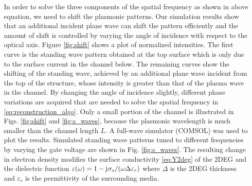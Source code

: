\documentclass[10pt]{article}
\renewcommand{\v}[1]{\mathbf{#1}} %
\renewcommand{\^}{\hat}  %
\renewcommand{\O}{\omega}  %
\newcommand{\E}{\varepsilon}  %
\newcommand{\p}{\rho}  %
\renewcommand{\^}{\hat}  %
\renewcommand{\j}{\mathrm{j}\mkern1mu} %
\begin{document}
%
In order to solve the three components of the spatial frequency as shown in above equation, we need to shift the plasmonic patterns. Our simulation results show that an additional incident plane wave can shift the pattern efficiently and the amount of shift is controlled by varying the angle of incidence with respect to the optical axis. Figure \ref{fig:shift} shows a plot of normalized intensities. The first curve is the standing wave pattern obtained at the top surface which is only due to the surface current in the channel below. The remaining curves show the shifting of the standing wave, achieved by an additional plane wave incident from the top of the structure, whose intensity is greater than that of the plasma wave in the channel. By changing the angle of incidence slightly, different phase variations are acquired that are needed to solve the spatial frequency in \eqref{eq:reconstruction_algo}. Only a small portion of the channel is illustrated in Figs. \ref{fig:shift} and
\ref{fig:s_waves}, because the plasmonic wavelength is much smaller than the channel length $L$. A full-wave simulator (COMSOL) was used to plot the results.
%
%
Simulated standing wave patterns tuned to different frequencies by varying the gate voltage are shown in Fig. \ref{fig:s_waves}. The resulting change in electron density modifies the surface conductivity \eqref{eq:Y2deg} of the 2DEG and the dielectric function $\E(\O) = 1 - \j \sigma_s /(\O \Delta \E_r)$ \cite{Ando1982} where $\Delta$ is the 2DEG thickness and $\E_r$ is the permittivity of the surrounding media.
\end{document}
